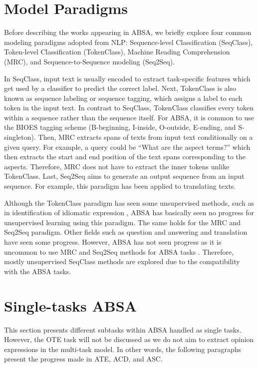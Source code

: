 \documentclass[american, oneside]{ecsgdp}
\begin{document}
\section{Model Paradigms} \label{sec:paradigms}
Before describing the works appearing in ABSA, we briefly explore four common modeling paradigms adopted from NLP: Sequence-level Classification (SeqClass), Token-level Classification (TokenClass), Machine Reading Comprehension (MRC), and Sequence-to-Sequence modeling (Seq2Seq).

In SeqClass, input text is usually encoded to extract task-specific features which get used by a classifier to predict the correct label. Next, TokenClass is also known as sequence labeling or sequence tagging, which assigns a label to each token in the input text. In contrast to SeqClass, TokenClass classifies every token within a sequence rather than the sequence itself. For ABSA, it is common to use the BIOES tagging scheme (B-beginning, I-inside, O-outside, E-ending, and S-singleton). Then, MRC extracts spans of texts from input text conditionally on a given query. For example, a query could be ``What are the aspect terms?'' which then extracts the start and end position of the text spans corresponding to the aspects. Therefore, MRC does not have to extract the inner tokens unlike TokenClass. Last, Seq2Seq aims to generate an output sequence from an input sequence. For example, this paradigm has been applied to translating texts.

Although the TokenClass paradigm has seen some unsupervised methods, such as in identification of idiomatic expression \parencite{Fazly2009UnsupervisedTokenClass}, ABSA has basically seen no progress for unsupervised learning using this paradigm. The same holds for the MRC and Seq2Seq paradigm. Other fields such as question and answering \parencite{Cui2020UnsupervisedMRC} and translation \parencite{Ramachandran2017UnsupervisedSeq2Seq} have seen some progress. However, ABSA has not seen progress as it is uncommon to use MRC and Seq2Seq methods for ABSA tasks \parencite{Zhang2022Survey}. Therefore, mostly unsupervised SeqClass methods are explored due to the compatibility with the ABSA tasks.

\section{Single-tasks ABSA} \label{sec:single}
This section presents different subtasks within ABSA handled as single tasks. However, the OTE task will not be discussed as we do not aim to extract opinion expressions in the multi-task model. In other words, the following paragraphs present the progress made in ATE, ACD, and ASC.
\end{document}
